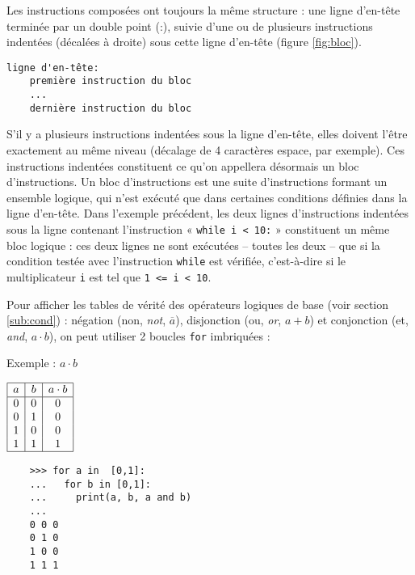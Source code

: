 Les instructions composées ont toujours la même structure : 
une ligne d'en-tête terminée par un double point ({:}), suivie
d'une ou de plusieurs instructions indentées (décalées à droite)
sous cette ligne d'en-tête (figure \ref{fig:bloc}).

\begin{py}{5cm}
\begin{verbatim}
ligne d'en-tête:
    première instruction du bloc
    ...
    dernière instruction du bloc
    \end{verbatim}
\end{py}

\noindent S'il y a plusieurs instructions indentées sous la ligne d'en-tête, elles doivent l'être exactement au
même niveau (décalage de 4 caractères espace, par exemple). Ces instructions indentées
constituent ce qu'on appellera désormais un bloc d'instructions. Un bloc d'instructions est une
suite d'instructions formant un ensemble logique, qui n'est exécuté que dans certaines conditions
définies dans la ligne d'en-tête. Dans l'exemple précédent, les deux lignes
d'instructions indentées sous la ligne contenant l'instruction « {\tt while i < 10:} » constituent un même 
bloc logique : ces deux lignes ne sont exécutées -- toutes les deux -- que si la condition testée 
avec l'instruction {\tt while} est vérifiée, c'est-à-dire si le multiplicateur {\tt i}
est tel que {\tt 1 <= i < 10}.

\begin{ex}\label{ex:verite}
Pour afficher les tables de vérité des opérateurs logiques
de base (voir section \ref{sub:cond}) :
négation (non, {\em not}, $\overline{a}$), 
disjonction (ou, {\em or}, $a+b$) et 
conjonction (et, {\em and}, $a\cdot b$),
on peut utiliser 2 boucles {\tt for} imbriquées :
	
	Exemple : $a\cdot b$ 
	
	\begin{minipage}[t]{5cm}
	$\begin{array}[t]{|c|c|c|}
	\hline
	a & b & a\cdot b\\
	\hline
	0 & 0 & 0\\
	0 & 1 & 0\\
	1 & 0 & 0\\
	1 & 1 & 1\\
	\hline
	\end{array}$
	\end{minipage}
	\hspace*{1cm}
	\begin{py}{5cm}
	\begin{verbatim}
	>>> for a in  [0,1]:
	...   for b in [0,1]:
	...     print(a, b, a and b)
	... 
	0 0 0
	0 1 0
	1 0 0
	1 1 1
	\end{verbatim}
	\end{py}
\end{ex}


